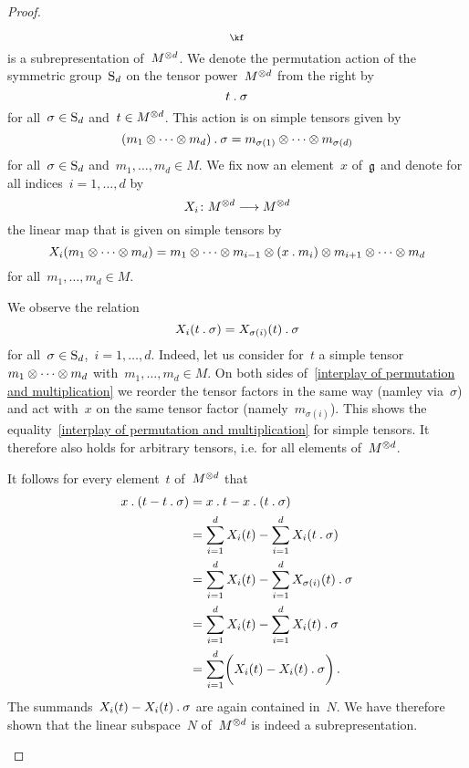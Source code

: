 \begin{proof}
\begin{enumerate}
\[{				}_{\kf}
			\]
			is a subrepresentation of~$M^{\otimes d}$.
			We denote the permutation action of the symmetric group~$\operatorname{S}_d$ on the tensor power~$M^{\otimes d}$ from the right by
			\[
				t \mathbin{.} \sigma
			\]
			for all~$\sigma \in \operatorname{S}_d$ and~$t \in M^{\otimes d}$.
			This action is on simple tensors given by
			\[
				(m_1 \otimes \dotsb \otimes m_d) \mathbin{.} \sigma
				=
				m_{\sigma(1)} \otimes \dotsb \otimes m_{\sigma(d)}
			\]
			for all~$\sigma \in \operatorname{S}_d$ and~$m_1, \dotsc, m_d \in M$.
			We fix now an element~$x$ of~$\mathfrak{g}$ and denote for all indices~$i = 1, \dotsc, d$ by
			\[
				X_i
				\colon
				M^{\tensor d}
				\to
				M^{\tensor d}
			\]
			the linear map that is given on simple tensors by
			\[
				X_i(m_1 \otimes \dotsb \otimes m_d)
				=
				m_1 \otimes \dotsb \otimes m_{i-1}
				\otimes (x \mathbin{.} m_i)
				\otimes m_{i+1} \otimes \dotsb \otimes m_d
			\]
			for all~$m_1, \dotsc, m_d \in M$.
			
			We observe the relation
			\begin{equation}
				\label{interplay of permutation and multiplication}
				X_i( t \mathbin{.} \sigma )
				=
				X_{\sigma(i)}(t) \mathbin{.} \sigma
			\end{equation}
			for all~$\sigma \in \operatorname{S}_d$,~$i = 1, \dotsc, d$.
			Indeed, let us consider for~$t$ a simple tensor~$m_1 \otimes \dotsb \otimes m_d$ with~$m_1, \dotsc, m_d \in M$.
			On both sides of~\eqref{interplay of permutation and multiplication} we reorder the tensor factors in the same way (namley via~$\sigma$) and act with~$x$ on the same tensor factor (namely~$m_{\sigma(i)}$).
			This shows the equality~\eqref{interplay of permutation and multiplication} for simple tensors.
			It therefore also holds for arbitrary tensors, i.e. for all elements of~$M^{\otimes d}$.
			
			It follows for every element~$t$ of~$M^{\otimes d}$ that
			\begin{align*}
				x \mathbin{.} ( t - t \mathbin{.} \sigma )
				&=
				x \mathbin{.} t - x \mathbin{.} (t \mathbin{.} \sigma)
				\\
				&=
				\sum_{i=1}^d X_i(t) - \sum_{i=1}^d X_i(t \mathbin{.} \sigma)
				\\
				&=
				\sum_{i=1}^d X_i(t) - \sum_{i=1}^d X_{\sigma(i)}(t) \mathbin{.} \sigma
				\\
				&=
				\sum_{i=1}^d X_i(t) - \sum_{i=1}^d X_i(t) \mathbin{.} \sigma
				\\
				&=
				\sum_{i=1}^d \biggl( X_i(t) - X_i(t) \mathbin{.} \sigma \biggr) \,.
			\end{align*}
			The summands~$X_i(t) - X_i(t) \mathbin{.} \sigma$ are again contained in~$N$.
			We have therefore shown that the linear subspace~$N$ of~$M^{\otimes d}$ is indeed a subrepresentation.
		\qedhere
	\end{enumerate}
\end{proof}





